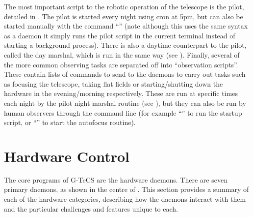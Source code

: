 \begin{colsection}
The most important script to the robotic operation of the telescope is the pilot, detailed in . The pilot is started every night using cron at 5pm, but can also be started manually with the command ``'' (note although this uses the same syntax as a daemon it simply runs the pilot script in the current terminal instead of starting a background process). There is also a daytime counterpart to the pilot, called the day marshal, which is run in the same way (see ). Finally, several of the more common observing tasks are separated off into ``observation scripts''. These contain lists of commands to send to the daemons to carry out tasks such as focusing the telescope, taking flat fields or starting/shutting down the hardware in the evening/morning respectively. These are run at specific times each night by the pilot night marshal routine (see ), but they can also be run by human observers through the command line (for example ``'' to run the startup script, or ``'' to start the autofocus routine).

\end{colsection}


\section{Hardware Control}
\label{sec:hardware_control}


\begin{colsection}

The core programs of G-TeCS are the hardware daemons. There are seven primary daemons, as shown in the centre of . This section provides a summary of each of the hardware categories, describing how the daemons interact with them and the particular challenges and features unique to each.

\end{colsection}


